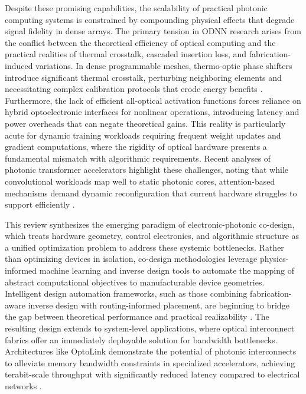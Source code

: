 \documentclass[11pt]{article}
\begin{document}
Despite these promising capabilities, the scalability of practical photonic computing systems is constrained by compounding physical effects that degrade signal fidelity in dense arrays. The primary tension in ODNN research arises from the conflict between the theoretical efficiency of optical computing and the practical realities of thermal crosstalk, cascaded insertion loss, and fabrication-induced variations. In dense programmable meshes, thermo-optic phase shifters introduce significant thermal crosstalk, perturbing neighboring elements and necessitating complex calibration protocols that erode energy benefits \citep{doi_10_1109_access_2020_3013116_8fec1fb2}. Furthermore, the lack of efficient all-optical activation functions forces reliance on hybrid optoelectronic interfaces for nonlinear operations, introducing latency and power overheads that can negate theoretical gains. This reality is particularly acute for dynamic training workloads requiring frequent weight updates and gradient computations, where the rigidity of optical hardware presents a fundamental mismatch with algorithmic requirements. Recent analyses of photonic transformer accelerators highlight these challenges, noting that while convolutional workloads map well to static photonic cores, attention-based mechanisms demand dynamic reconfiguration that current hardware struggles to support efficiently \citep{doi_10_1109_hpca57654_2024_00059_f488ee7a}.

This review synthesizes the emerging paradigm of electronic-photonic co-design, which treats hardware geometry, control electronics, and algorithmic structure as a unified optimization problem to address these systemic bottlenecks. Rather than optimizing devices in isolation, co-design methodologies leverage physics-informed machine learning and inverse design tools to automate the mapping of abstract computational objectives to manufacturable device geometries. Intelligent design automation frameworks, such as those combining fabrication-aware inverse design with routing-informed placement, are beginning to bridge the gap between theoretical performance and practical realizability \citep{doi_10_1117_12_3066105_d6297c38}. The resulting design extends to system-level applications, where optical interconnect fabrics offer an immediately deployable solution for bandwidth bottlenecks. Architectures like OptoLink demonstrate the potential of photonic interconnects to alleviate memory bandwidth constraints in specialized accelerators, achieving terabit-scale throughput with significantly reduced latency compared to electrical networks \citep{doi_10_1145_3806395_315ab915}.
\end{document}
